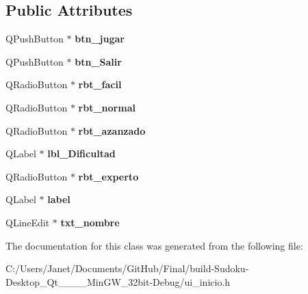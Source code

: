 \subsection*{Public Attributes}
\begin{DoxyCompactItemize}
\item 
\hypertarget{class_ui___inicio_a361663afe17bec1307d987567c1ad8b3}{Q\-Push\-Button $\ast$ {\bfseries btn\-\_\-jugar}}\label{class_ui___inicio_a361663afe17bec1307d987567c1ad8b3}

\item 
\hypertarget{class_ui___inicio_aba8ea0f0be152b9fef6003c681fe30f1}{Q\-Push\-Button $\ast$ {\bfseries btn\-\_\-\-Salir}}\label{class_ui___inicio_aba8ea0f0be152b9fef6003c681fe30f1}

\item 
\hypertarget{class_ui___inicio_a2916bec7b4a674d6a123e468ee2a5d24}{Q\-Radio\-Button $\ast$ {\bfseries rbt\-\_\-facil}}\label{class_ui___inicio_a2916bec7b4a674d6a123e468ee2a5d24}

\item 
\hypertarget{class_ui___inicio_a8a2bc7dc7d0d8a833ebf39b0c7e17077}{Q\-Radio\-Button $\ast$ {\bfseries rbt\-\_\-normal}}\label{class_ui___inicio_a8a2bc7dc7d0d8a833ebf39b0c7e17077}

\item 
\hypertarget{class_ui___inicio_a4b54d34de325e64490fa22fd8b5c3bb1}{Q\-Radio\-Button $\ast$ {\bfseries rbt\-\_\-azanzado}}\label{class_ui___inicio_a4b54d34de325e64490fa22fd8b5c3bb1}

\item 
\hypertarget{class_ui___inicio_a20370dc2581bd0a42b59d7152e5cb50d}{Q\-Label $\ast$ {\bfseries lbl\-\_\-\-Dificultad}}\label{class_ui___inicio_a20370dc2581bd0a42b59d7152e5cb50d}

\item 
\hypertarget{class_ui___inicio_a0ada40e0cac6711f74d0feaa190d32bc}{Q\-Radio\-Button $\ast$ {\bfseries rbt\-\_\-experto}}\label{class_ui___inicio_a0ada40e0cac6711f74d0feaa190d32bc}

\item 
\hypertarget{class_ui___inicio_a2584b209fded25e76aeede0317b69d86}{Q\-Label $\ast$ {\bfseries label}}\label{class_ui___inicio_a2584b209fded25e76aeede0317b69d86}

\item 
\hypertarget{class_ui___inicio_a3a0fd3c856ac65f3aa271a51652cee37}{Q\-Line\-Edit $\ast$ {\bfseries txt\-\_\-nombre}}\label{class_ui___inicio_a3a0fd3c856ac65f3aa271a51652cee37}

\end{DoxyCompactItemize}


The documentation for this class was generated from the following file\-:\begin{DoxyCompactItemize}
\item 
C\-:/\-Users/\-Janet/\-Documents/\-Git\-Hub/\-Final/build-\/\-Sudoku-\/\-Desktop\-\_\-\-Qt\-\_\-\_\-\_\-\_\-\-Min\-G\-W\-\_\-32bit-\/\-Debug/ui\-\_\-inicio.\-h\end{DoxyCompactItemize}
